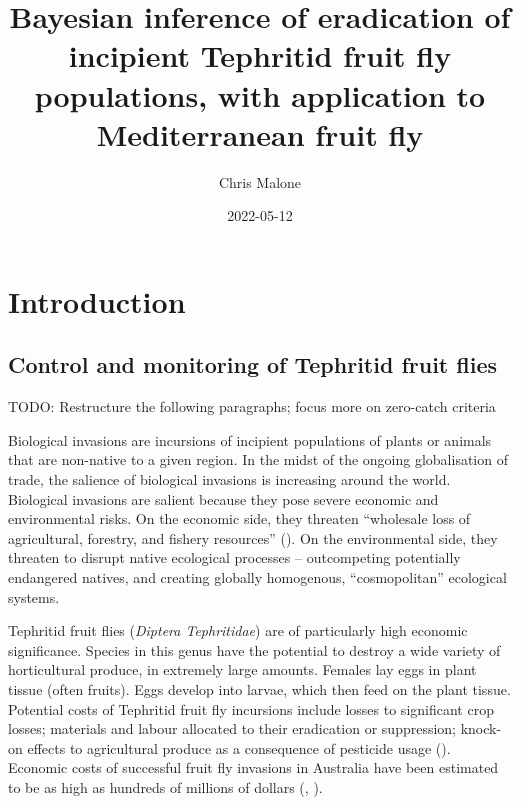 \documentclass[
]{book}
\title{Bayesian inference of eradication of incipient Tephritid fruit fly populations, with application to Mediterranean fruit fly}
\author{Chris Malone}
\date{2022-05-12}
\begin{document}
\maketitle

\renewcommand{\baselinestretch}{1}\normalsize
\tableofcontents
\renewcommand{\baselinestretch}{2}\normalsize

\hypertarget{introduction}{%
\chapter{Introduction}\label{introduction}}

\hypertarget{control-and-monitoring-of-tephritid-fruit-flies}{%
\section{Control and monitoring of Tephritid fruit flies}\label{control-and-monitoring-of-tephritid-fruit-flies}}

TODO: Restructure the following paragraphs; focus more on zero-catch criteria

Biological invasions are incursions of incipient populations of plants or animals that are non-native to a given region. In the midst of the ongoing globalisation of trade, the salience of biological invasions is increasing around the world. Biological invasions are salient because they pose severe economic and environmental risks. On the economic side, they threaten ``wholesale loss of agricultural, forestry, and fishery resources'' (\citet{mack2000}). On the environmental side, they threaten to disrupt native ecological processes -- outcompeting potentially endangered natives, and creating globally homogenous, ``cosmopolitan'' ecological systems.

Tephritid fruit flies (\emph{Diptera Tephritidae}) are of particularly high economic significance. Species in this genus have the potential to destroy a wide variety of horticultural produce, in extremely large amounts. Females lay eggs in plant tissue (often fruits). Eggs develop into larvae, which then feed on the plant tissue. Potential costs of Tephritid fruit fly incursions include losses to significant crop losses; materials and labour allocated to their eradication or suppression; knock-on effects to agricultural produce as a consequence of pesticide usage (\citet{suckling2016}). Economic costs of successful fruit fly invasions in Australia have been estimated to be as high as hundreds of millions of dollars (\citet{suckling2016}, \citet{hancock2000}).
\end{document}
